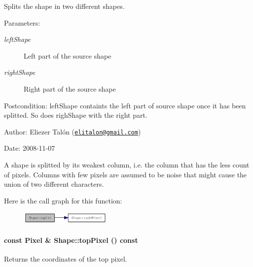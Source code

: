 Splits the shape in two different shapes. 

\begin{Desc}
\item[Parameters:]
\begin{description}
\item[{\em leftShape}]Left part of the source shape \item[{\em rightShape}]Right part of the source shape\end{description}
\end{Desc}
\begin{Desc}
\item[Postcondition:]leftShape containts the left part of source shape once it has been splitted. So does righShape with the right part.\end{Desc}
\begin{Desc}
\item[Author:]Eliezer Talón (\href{mailto:elitalon@gmail.com}{\tt elitalon@gmail.com}) \end{Desc}
\begin{Desc}
\item[Date:]2008-11-07\end{Desc}
A shape is splitted by its weakest column, i.e. the column that has the less count of pixels. Columns with few pixels are assumed to be noise that might cause the union of two different characters. 

Here is the call graph for this function:\nopagebreak
\begin{figure}[H]
\begin{center}
\leavevmode
\includegraphics[width=126pt]{class_shape_bcb7d1626e403703952967533c9004ce_cgraph}
\end{center}
\end{figure}
\hypertarget{class_shape_063c4934d8c1cd4b02e4e3e4a604f62e}{
\paragraph[{topPixel}]{\setlength{\rightskip}{0pt plus 5cm}const {\bf Pixel} \& Shape::topPixel () const}\hfill}
\label{class_shape_063c4934d8c1cd4b02e4e3e4a604f62e}


Returns the coordinates of the top pixel. 

